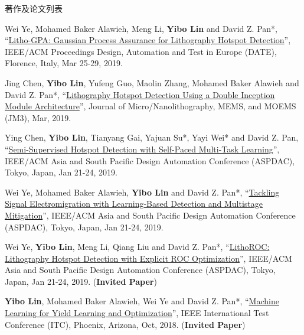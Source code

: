 \begin{rSection}{著作及论文列表}
\begin{description}[font=\normalfont, rightmargin=2em]
{}
            

\item[{[C35]}]{
        Wei Ye, Mohamed Baker Alawieh, Meng Li, \textbf{Yibo Lin} and David Z. Pan*, 
    ``\href{https://doi.org/10.23919/DATE.2019.8714960}{Litho-GPA: Gaussian Process Assurance for Lithography Hotspot Detection}'', 
    IEEE/ACM Proceedings Design, Automation and Test in Europe (DATE), Florence, Italy, Mar 25-29, 2019.
    
}
            

\item[{[J34]}]{
        Jing Chen, \textbf{Yibo Lin}, Yufeng Guo, Maolin Zhang, Mohamed Baker Alawieh and David Z. Pan*, 
    ``\href{https://doi.org/10.1117/1.JMM.18.1.013507}{Lithography Hotspot Detection Using a Double Inception Module Architecture}'', 
    Journal of Micro/Nanolithography, MEMS, and MOEMS (JM3), Mar, 2019.
    
}
            

\item[{[C33]}]{
        Ying Chen, \textbf{Yibo Lin}, Tianyang Gai, Yajuan Su*, Yayi Wei* and David Z. Pan, 
    ``\href{https://doi.org/10.1145/3287624.3287685}{Semi-Supervised Hotspot Detection with Self-Paced Multi-Task Learning}'', 
    IEEE/ACM Asia and South Pacific Design Automation Conference (ASPDAC), Tokyo, Japan, Jan 21-24, 2019.
    
}
            

\item[{[C32]}]{
        Wei Ye, Mohamed Baker Alawieh, \textbf{Yibo Lin} and David Z. Pan*, 
    ``\href{https://doi.org/10.1145/3287624.3287688}{Tackling Signal Electromigration with Learning-Based Detection and Multistage Mitigation}'', 
    IEEE/ACM Asia and South Pacific Design Automation Conference (ASPDAC), Tokyo, Japan, Jan 21-24, 2019.
    
}
            

\item[{[C31]}]{
        Wei Ye, \textbf{Yibo Lin}, Meng Li, Qiang Liu and David Z. Pan*, 
    ``\href{https://doi.org/10.1145/3287624.3288746}{LithoROC: Lithography Hotspot Detection with Explicit ROC Optimization}'', 
    IEEE/ACM Asia and South Pacific Design Automation Conference (ASPDAC), Tokyo, Japan, Jan 21-24, 2019.
    (\textbf{Invited Paper})
}
            

\item[{[C30]}]{
        \textbf{Yibo Lin}, Mohamed Baker Alawieh, Wei Ye and David Z. Pan*, 
    ``\href{https://doi.org/10.1109/TEST.2018.8624733}{Machine Learning for Yield Learning and Optimization}'', 
    IEEE International Test Conference (ITC), Phoenix, Arizona, Oct, 2018.
    (\textbf{Invited Paper})
}
            


\end{description}
\end{rSection}
